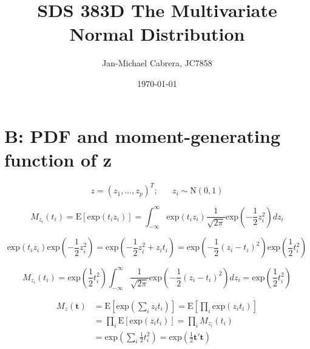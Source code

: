 \documentclass[12pt]{article}
\begin{document}
    \title{SDS 383D The Multivariate Normal Distribution}
    \author{Jan-Michael Cabrera, JC7858}
    \date{\today}
    \maketitle

    \section*{B: PDF and moment-generating function of z}

        \begin{equation}
            z = (z_1,...,z_p)^T; \hspace{20pt} z_i \sim \text{N}(0,1)
        \end{equation}

        \begin{equation}
            M_{z_i}(t_i) = \text{E}[\text{exp}(t_i z_i)] = \int_{-\infty}^\infty \text{exp}(t_i z_i) \frac{1}{\sqrt{2 \pi}} \text{exp}\left( -\frac{1}{2} z_i^2 \right) dz_i
        \end{equation}

        \begin{equation}
            \text{exp}(t_i z_i) \text{exp}\left( -\frac{1}{2} z_i^2 \right) = \text{exp}\left( -\frac{1}{2} z_i^2 + z_i t_i\right) = \text{exp}\left( -\frac{1}{2}(z_i - t_i)^2 \right) \text{exp} \left (\frac{1}{2} t_i^2 \right)
        \end{equation}

        \begin{equation}
            M_{z_i}(t_i) = \text{exp}\left( \frac{1}{2} t_i^2\right) \int_{-\infty}^{\infty} \frac{1}{\sqrt{2\pi}} \text{exp}\left( - \frac{1}{2} (z_i - t_i)^2\right) dz_i = \text{exp}\left( \frac{1}{2}t_i^2 \right )
        \end{equation}

        \begin{align}
            M_z(\mathbf{t}) &= \text{E}\left[\text{exp}\left(\sum_i z_i t_i\right)\right] = \text{E}\left[ \prod_i \text{exp}(z_i t_i)\right]\\
            &= \prod_i \text{E}[\text{exp}(z_i t_i)] = \prod_i M_{z_i}(t_i)\\
            &= \text{exp}\left( \sum_i \frac{1}{2} t_i^2 \right) = \text{exp}\left ( \frac{1}{2} \mathbf{t't}\right)
        \end{align}
\end{document}
